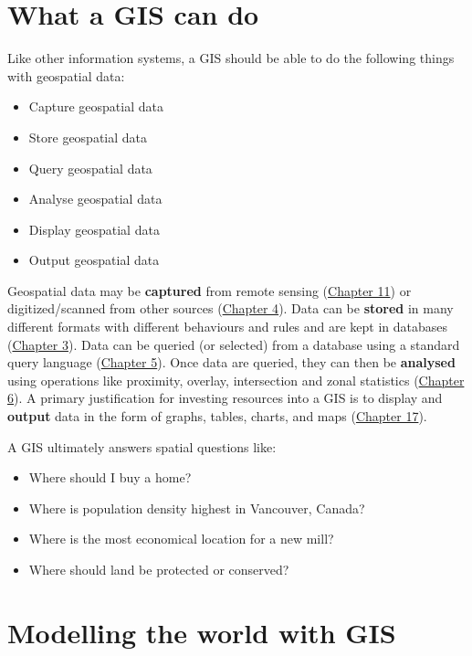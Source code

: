 \documentclass[
]{book}
\providecommand{\tightlist}{%
  \setlength{\itemsep}{0pt}\setlength{\parskip}{0pt}}
\begin{document}
\hypertarget{what-a-gis-can-do}{%
\section{What a GIS can do}\label{what-a-gis-can-do}}

Like other information systems, a GIS should be able to do the following things with geospatial data:

\begin{itemize}
\tightlist
\item
  Capture geospatial data
\item
  Store geospatial data
\item
  Query geospatial data
\item
  Analyse geospatial data
\item
  Display geospatial data
\item
  Output geospatial data
\end{itemize}

Geospatial data may be \textbf{captured} from remote sensing (\href{./collecting-and-editing-data.html}{Chapter 11}) or digitized/scanned from other sources (\href{./collecting-and-editing-data.html}{Chapter 4}). Data can be \textbf{stored} in many different formats with different behaviours and rules and are kept in databases (\href{./types-of-data.html}{Chapter 3}). Data can be queried (or selected) from a database using a standard query language (\href{./relational-databases.html}{Chapter 5}). Once data are queried, they can then be \textbf{analysed} using operations like proximity, overlay, intersection and zonal statistics (\href{./overlay-and-proximity-analysis.html}{Chapter 6}). A primary justification for investing resources into a GIS is to display and \textbf{output} data in the form of graphs, tables, charts, and maps (\href{./making-beautiful-maps.html}{Chapter 17}).

A GIS ultimately answers spatial questions like:

\begin{itemize}
\tightlist
\item
  Where should I buy a home?
\item
  Where is population density highest in Vancouver, Canada?
\item
  Where is the most economical location for a new mill?
\item
  Where should land be protected or conserved?
\end{itemize}

\hypertarget{modelling-the-world-with-gis}{%
\section{Modelling the world with GIS}\label{modelling-the-world-with-gis}}
\end{document}

